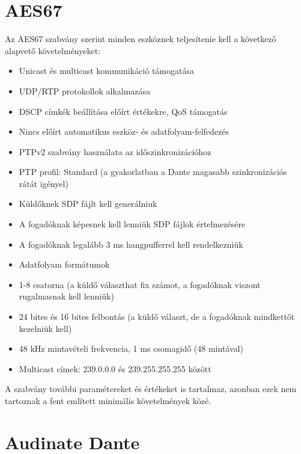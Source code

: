 \section{AES67}

Az AES67 szabvány szerint minden eszköznek teljesítenie kell a következő alapvető követelményeket:

\begin{itemize}
	\item Unicast és multicast kommunikáció támogatása
	\item UDP/RTP protokollok alkalmazása
	\item DSCP címkék beállítása előírt értékekre, QoS támogatás
	\item Nincs előírt automatikus eszköz- és adatfolyam-felfedezés
	\item PTPv2 szabvány használata az időszinkronizációhoz
	\item PTP profil: Standard (a gyakorlatban a Dante magasabb szinkronizációs rátát igényel)
	\item Küldőknek SDP fájlt kell generálniuk
	\item A fogadóknak képesnek kell lenniük SDP fájlok értelmezésére
	\item A fogadóknak legalább 3 ms hangpufferrel kell rendelkezniük
	\item Adatfolyam formátumok
	\item 1-8 csatorna (a küldő választhat fix számot, a fogadóknak viszont rugalmasnak kell lenniük)
	\item 24 bites és 16 bites felbontás (a küldő választ, de a fogadóknak mindkettőt kezelniük kell)
	\item 48 kHz mintavételi frekvencia, 1 ms csomagidő (48 mintával)
	\item Multicast címek: 239.0.0.0 és 239.255.255.255 között
\end{itemize}

A szabvány további paramétereket és értékeket is tartalmaz, azonban ezek nem
tartoznak a fent említett minimális követelmények közé.

\section{Audinate Dante}
